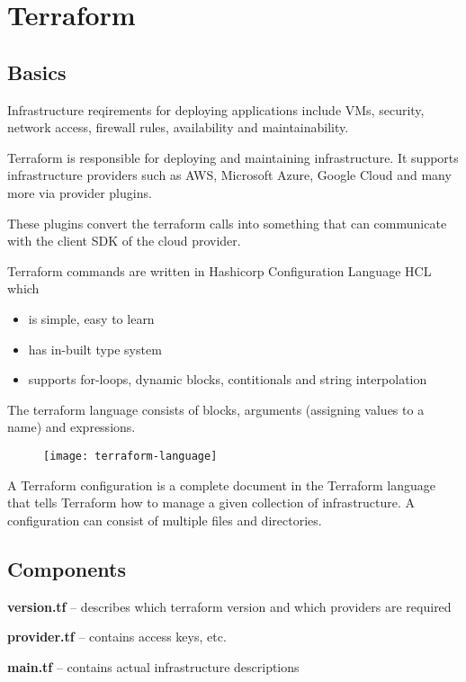 \section{Terraform}

\subsection{Basics}
Infrastructure reqirements for deploying applications include VMs, security, network access, firewall rules, 
availability and maintainability.

Terraform is responsible for deploying and maintaining infrastructure. It supports infrastructure providers such as AWS,
 Microsoft Azure, Google Cloud and many more via provider plugins.

These plugins convert the terraform calls into something that can communicate with the client SDK of the cloud provider. 

Terraform commands are written in Hashicorp Configuration Language HCL which
\begin{itemize}
    \item is simple, easy to learn
    \item has in-built type system
    \item supports for-loops, dynamic blocks, contitionals and string interpolation
\end{itemize}

The terraform language consists of blocks, arguments (assigning values to a name) and expressions.

\begin{figure}[h]
    \centering
    \texttt{[image: terraform-language]}
\end{figure}

A Terraform configuration is a complete document in the Terraform language that tells Terraform
 how to manage a given collection of infrastructure. 
A configuration can consist of multiple files and directories.

\subsection{Components}
\textbf{version.tf} -- describes which terraform version and which providers are required 

\noindent
\textbf{provider.tf} -- contains access keys, etc.

\noindent
\textbf{main.tf} -- contains actual infrastructure descriptions

